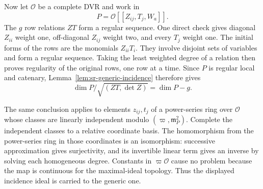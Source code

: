 Now let $\mathcal O$ be a complete DVR and work in
\[
 P=\mathcal O[[Z_{ij},T_j,W_a]].
\]
The $g$ row relations $ZT$ form a regular sequence.
One direct check gives diagonal $Z_{ii}$ weight one,
off-diagonal $Z_{ij}$ weight two, and every $T_j$ weight one.
The initial forms of the rows are the monomials $Z_{ii}T_i$.
They involve disjoint sets of variables and form a regular sequence.
Taking the least weighted degree of a relation then proves regularity
of the original rows, one row at a time.
Since $P$ is regular local and catenary, Lemma~\ref{lem:sr-generic-incidence}
therefore gives
\begin{equation}\label{eq:sr-incidence-dimension}
               \dim P/\sqrt{(ZT,\det Z)}=\dim P-g.
\end{equation}

The same conclusion applies to elements $z_{ij},t_j$ of a power-series
ring over $\mathcal O$ whose classes are linearly independent modulo
$(\varpi,\mathfrak m_P^2)$.
Complete the independent classes to a relative coordinate basis.
The homomorphism from the power-series ring in those coordinates is
an isomorphism: successive approximation gives surjectivity, and its
invertible linear term gives an inverse by solving each homogeneous
degree. Constants in $\varpi\mathcal O$ cause no problem because the
map is continuous for the maximal-ideal topology.
Thus the displayed incidence ideal is carried to the generic one.

